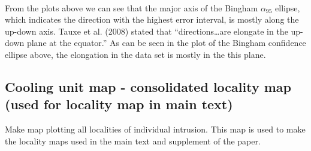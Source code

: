 \documentclass{article}
\begin{document}
    \begin{center}
    \end{center}
    { \hspace*{\fill} \\}
    
    From the plots above we can see that the major axis of the Bingham
\(\alpha\)\(_{95}\) ellipse, which indicates the direction with the
highest error interval, is mostly along the up-down axis. Tauxe et al.
(2008) stated that ``directions\ldots{}are elongate in the up-down plane
at the equator.'' As can be seen in the plot of the Bingham confidence
ellipse above, the elongation in the data set is mostly in the this
plane.

    \subsection{Cooling unit map - consolidated locality map (used for
locality map in main
text)}\label{cooling-unit-map---consolidated-locality-map-used-for-locality-map-in-main-text}

    Make map plotting all localities of individual intrusion. This map is
used to make the locality maps used in the main text and supplement of
the paper.
\end{document}
